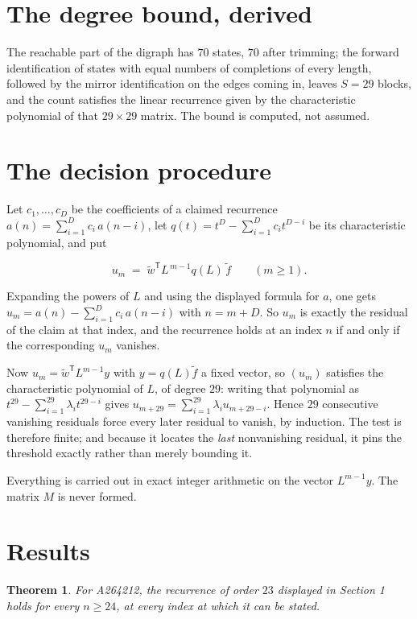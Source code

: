 \documentclass[11pt]{article}
\newtheorem{theorem}{Theorem}
\theoremstyle{definition}
\begin{document}
\section{The degree bound, derived}

The reachable part of the digraph has $70$ states, $70$ after trimming; the forward identification of states with equal numbers of completions of every length, followed by the mirror identification on the edges coming in, leaves $S = 29$ blocks, and the count satisfies the linear recurrence given by the characteristic polynomial of that $29\times29$ matrix. The bound is computed, not assumed.

\section{The decision procedure}

Let $c_1,\dots,c_D$ be the coefficients of a claimed recurrence $a(n) = \sum_{i=1}^{D} c_i\,a(n-i)$, let $q(t) = t^{D} - \sum_{i=1}^{D} c_i t^{D-i}$ be its characteristic polynomial, and put

\[u_m \;=\; \tilde w^{\mathsf T} L^{\,m-1} q(L)\,\tilde f \qquad (m \ge 1).\]

Expanding the powers of $L$ and using the displayed formula for $a$, one gets $u_m = a(n) - \sum_{i=1}^{D} c_i\,a(n-i)$ with $n = m + D$. So $u_m$ is exactly the residual of the claim at that index, and the recurrence holds at an index $n$ if and only if the corresponding $u_m$ vanishes.

Now $u_m = \tilde w^{\mathsf T} L^{m-1} y$ with $y = q(L)\tilde f$ a fixed vector, so $(u_m)$ satisfies the characteristic polynomial of $L$, of degree $29$: writing that polynomial as $t^{29} - \sum_{i=1}^{29} \lambda_i t^{29-i}$ gives $u_{m+29} = \sum_{i=1}^{29} \lambda_i u_{m+29-i}$. Hence $29$ consecutive vanishing residuals force every later residual to vanish, by induction. The test is therefore finite; and because it locates the {\itshape last} nonvanishing residual, it pins the threshold exactly rather than merely bounding it.

Everything is carried out in exact integer arithmetic on the vector $L^{m-1}y$. The matrix $M$ is never formed.

\section{Results}

\begin{theorem} For A264212, the recurrence of order $23$ displayed in Section 1 holds for every $n \ge 24$, at every index at which it can be stated.\end{theorem}
\end{document}
